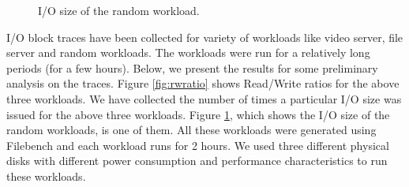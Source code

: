 \begin{figure}[ht]
\begin{centering}
\caption{I/O size of the random workload.}
\label{fig:randomiosize}
\end{centering}
\end{figure}

I/O block traces have been collected for variety of workloads like
video server, file server and random workloads. The workloads were run
for a relatively long periods (for a few hours). Below, we present the
results for some preliminary analysis on the traces. Figure
\ref{fig:rwratio} shows Read/Write ratios for the above three
workloads.  We have collected the number of times a particular I/O
size was issued for the above three workloads. Figure
\ref{fig:randomiosize}, which shows the I/O size of the random
workloads, is one of them. All these workloads were generated using
Filebench and each workload runs for 2 hours. We used three different
physical disks with different power consumption and performance
characteristics to run these workloads. 

